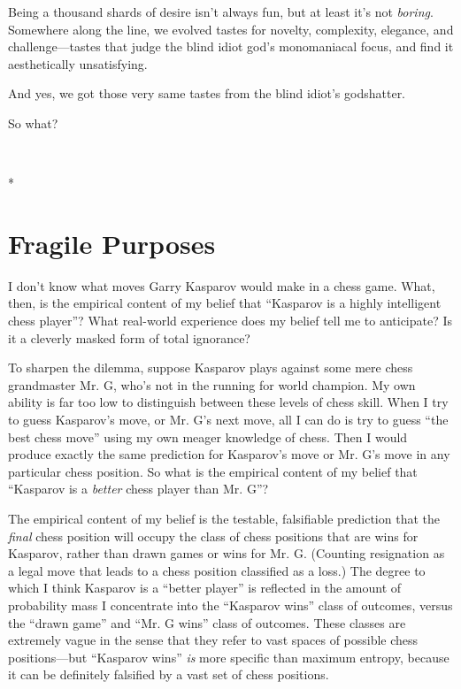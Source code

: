 {
 Being a thousand shards of desire isn't always
fun, but at least it's not \textit{boring}. Somewhere
along the line, we evolved tastes for novelty, complexity, elegance,
and challenge---tastes that judge the blind idiot god's
monomaniacal focus, and find it aesthetically unsatisfying.}

{
 And yes, we got those very same tastes from the blind
idiot's godshatter.}

{
 So what?}

{\centering
 \ ~
\par}

{\centering
 *
\par}

\chapter{Fragile Purposes}


{
 I don't know what moves Garry Kasparov would make
in a chess game. What, then, is the empirical content of my belief that
``Kasparov is a highly intelligent chess
player''? What real-world experience does my belief
tell me to anticipate? Is it a cleverly masked form of total ignorance?
}

{
 To sharpen the dilemma, suppose Kasparov plays against some mere
chess grandmaster Mr. G, who's not in the running for
world champion. My own ability is far too low to distinguish between
these levels of chess skill. When I try to guess
Kasparov's move, or Mr. G's next move,
all I can do is try to guess ``the best chess
move'' using my own meager knowledge of chess. Then I
would produce exactly the same prediction for
Kasparov's move or Mr. G's move in any
particular chess position. So what is the empirical content of my
belief that ``Kasparov is a \textit{better} chess
player than Mr. G''?}

{
 The empirical content of my belief is the testable, falsifiable
prediction that the \textit{final} chess position will occupy the class
of chess positions that are wins for Kasparov, rather than drawn games
or wins for Mr. G. (Counting resignation as a legal move that leads to
a chess position classified as a loss.) The degree to which I think
Kasparov is a ``better player'' is
reflected in the amount of probability mass I concentrate into the
``Kasparov wins'' class of outcomes,
versus the ``drawn game'' and
``Mr. G wins'' class of outcomes.
These classes are extremely vague in the sense that they refer to vast
spaces of possible chess positions---but ``Kasparov
wins'' \textit{is} more specific than maximum
entropy, because it can be definitely falsified by a vast set of chess
positions.}


